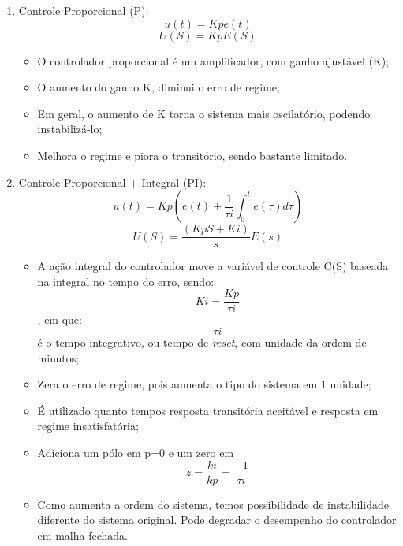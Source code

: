 \begin{enumerate}
    \item Controle Proporcional (P):
    \[u(t)=Kpe(t)\] 
    \[U(S)=KpE(S)\]
        \begin{itemize}
            \item O controlador proporcional é um amplificador, com ganho ajustável (K);
            \item O aumento do ganho K, diminui o erro de regime;
            \item Em geral, o aumento de K torna o sistema mais oscilatório, podendo instabilizá-lo;
            \item Melhora o regime e piora o transitório, sendo bastante limitado.
        \end{itemize}
        
    \item Controle Proporcional + Integral (PI):
    \[u(t)=Kp(e(t)+\frac{1}{\tau i}\int_{0}^{t}e(\tau)d\tau)\]
    \[U(S)=\frac{(KpS+Ki)}{s}E(s)\]
        \begin{itemize}
            \item A ação integral do controlador move a variável de controle C(S) baseada na integral no tempo do erro, sendo: \[Ki=\frac{Kp}{\tau i}\], em que: \[\tau i\] é o tempo integrativo, ou tempo de \emph{reset}, com unidade da ordem de minutos;
            \item Zera o erro de regime, pois aumenta o tipo do sistema em 1 unidade;
            \item É utilizado quanto tempos resposta transitória aceitável e resposta em regime insatisfatória;
            \item Adiciona um pólo em p=0 e um zero em \[z=\frac{ki}{kp}=\frac{-1}{\tau i}\]
            \item Como aumenta a ordem do sistema, temos possibilidade de instabilidade diferente do sistema original. Pode degradar o desempenho do controlador em malha fechada.
        \end{itemize}
        

\end{enumerate}
